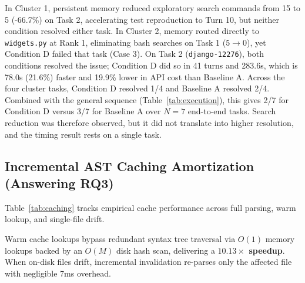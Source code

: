 \documentclass[conference]{IEEEtran}
\begin{document}
In Cluster 1, persistent memory reduced exploratory search commands from 15 to 5 (-66.7\%) on Task 2, accelerating test reproduction to Turn 10, but neither condition resolved either task. In Cluster 2, memory routed directly to \texttt{widgets.py} at Rank 1, eliminating bash searches on Task 1 ($5 \to 0$), yet Condition D failed that task (Case 3). On Task 2 (\texttt{django-12276}), both conditions resolved the issue; Condition D did so in 41 turns and 283.6s, which is 78.0s (21.6\%) faster and 19.9\% lower in API cost than Baseline A. Across the four cluster tasks, Condition D resolved 1/4 and Baseline A resolved 2/4. Combined with the general sequence (Table~\ref{tab:execution}), this gives 2/7 for Condition D versus 3/7 for Baseline A over $N=7$ end-to-end tasks. Search reduction was therefore observed, but it did not translate into higher resolution, and the timing result rests on a single task.

\subsection{Incremental AST Caching Amortization (Answering RQ3)}
Table~\ref{tab:caching} tracks empirical cache performance across full parsing, warm lookup, and single-file drift.

\begin{table}[!t]
\caption{Incremental AST Caching and Invalidation Benchmarks}
\label{tab:caching}
\centering
\setlength{\tabcolsep}{3.5pt}
\end{table}

Warm cache lookups bypass redundant syntax tree traversal via $O(1)$ memory lookups backed by an $O(M)$ disk hash scan, delivering a \textbf{$10.13\times$ speedup}. When on-disk files drift, incremental invalidation re-parses only the affected file with negligible 7ms overhead.
\end{document}
